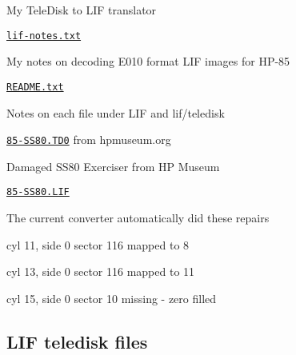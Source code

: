 \begin{DoxyItemize}
\begin{DoxyItemize}
\begin{DoxyItemize}
\begin{DoxyItemize}
\item My Tele\+Disk to L\+IF translator
\end{DoxyItemize}
\item \href{lif/lif-notes.txt}{\tt lif-\/notes.\+txt}
\begin{DoxyItemize}
\item My notes on decoding E010 format L\+IF images for H\+P-\/85
\end{DoxyItemize}
\item \href{lif/README.txt}{\tt R\+E\+A\+D\+M\+E.\+txt}
\begin{DoxyItemize}
\item Notes on each file under L\+IF and lif/teledisk
\end{DoxyItemize}
\item \href{lif/85-SS80.TD0}{\tt 85-\/\+S\+S80.\+T\+D0} from hpmuseum.\+org
\begin{DoxyItemize}
\item Damaged S\+S80 Exerciser from HP Museum
\end{DoxyItemize}
\item \href{lif/85-SS80.LIF}{\tt 85-\/\+S\+S80.\+L\+IF}
\begin{DoxyItemize}
\item The current converter automatically did these repairs
\begin{DoxyItemize}
\item cyl 11, side 0 sector 116 mapped to 8
\item cyl 13, side 0 sector 116 mapped to 11
\item cyl 15, side 0 sector 10 missing -\/ zero filled
\end{DoxyItemize}
\end{DoxyItemize}
\end{DoxyItemize}
\end{DoxyItemize}
\end{DoxyItemize}

\subsection*{L\+IF teledisk files}


